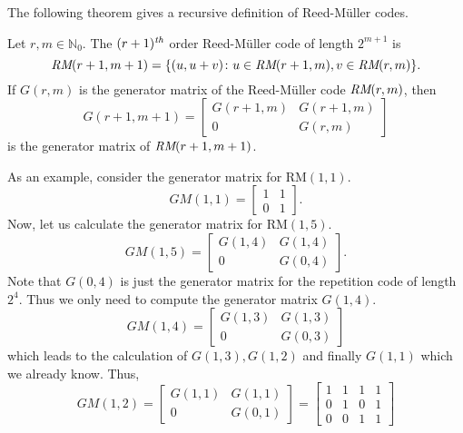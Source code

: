 \documentclass[english,bachelor]{liumaiex}
\begin{document}
The following theorem gives a recursive definition of Reed-M{\"u}ller codes.
\begin{thm}
Let $r, m \in\mathbb{N}_{0}$. The $(r+1)^{\emph{th}}$ order Reed-M{\"u}ller code of length $2^{m+1}$ is
\begin{displaymath}
\emph{RM}(r+1,m+1)=\{(u,u+v)\colon u\in\emph{RM}(r+1,m),v\in\emph{RM}(r,m)\}.
\end{displaymath}
If $G(r,m)$ is the generator matrix of the Reed-M{\"u}ller code $\emph{RM}(r,m)$, then
\begin{displaymath}
G(r+1,m+1)=
\begin{bmatrix}
G(r+1,m) 	& G(r+1,m) \\
0			& G(r,m)
\end{bmatrix}
\end{displaymath}
is the generator matrix of $\emph{RM}(r+1,m+1)$.
\end{thm}
As an example, consider the generator matrix for $\textrm{RM}(1,1)$.
\begin{displaymath}
GM(1,1)=
\begin{bmatrix}
1 	& 1 \\
0	& 1
\end{bmatrix}.
\end{displaymath}
Now, let us calculate the generator matrix for $\textrm{RM}(1,5)$.
\begin{displaymath}
GM(1,5)=
\begin{bmatrix}
G(1,4) 	& G(1,4) \\
0		& G(0,4)
\end{bmatrix}.
\end{displaymath}
Note that $G(0,4)$ is just the generator matrix for the repetition code of length $2^4$. Thus we only need to compute the generator matrix $G(1,4)$.
\begin{displaymath}
GM(1,4)=
\begin{bmatrix}
G(1,3) 	& G(1,3) \\
0		& G(0,3)
\end{bmatrix}
\end{displaymath}
which leads to the calculation of $G(1,3), G(1,2)$ and finally $G(1,1)$ which we already know. Thus,
\begin{displaymath}
GM(1,2)=
\begin{bmatrix}
G(1,1) 	& G(1,1)\\
0		& G(0,1)
\end{bmatrix}
=
\begin{bmatrix}
1 & 1 & 1 & 1\\
0 & 1 & 0 & 1\\
0 & 0 & 1 & 1
\end{bmatrix}
\end{displaymath}
\end{document}

